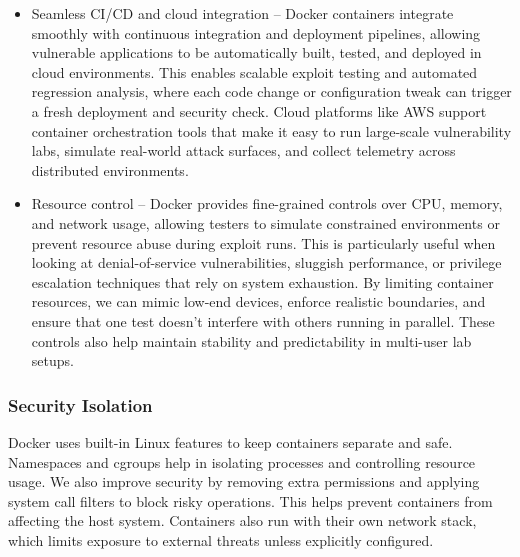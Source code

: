 \documentclass[12pt,titlepage]{article}
\begin{document}
\begin{itemize}
    \item {Seamless CI/CD and cloud integration} – Docker containers integrate smoothly with continuous integration and deployment pipelines, allowing vulnerable applications to be automatically built, tested, and deployed in cloud environments. This enables scalable exploit testing and automated regression analysis, where each code change or configuration tweak can trigger a fresh deployment and security check. Cloud platforms like AWS support container orchestration tools that make it easy to run large-scale vulnerability labs, simulate real-world attack surfaces, and collect telemetry across distributed environments.
	\item {Resource control} – Docker provides fine-grained controls over CPU, memory, and network usage, allowing testers to simulate constrained environments or prevent resource abuse during exploit runs. This is particularly useful when looking at denial-of-service vulnerabilities, sluggish performance, or privilege escalation techniques that rely on system exhaustion. By limiting container resources, we can mimic low-end devices, enforce realistic boundaries, and ensure that one test doesn’t interfere with others running in parallel. These controls also help maintain stability and predictability in multi-user lab setups.
  \end{itemize}

\subsubsection{Security Isolation}
Docker uses built-in Linux features to keep containers separate and safe. Namespaces and cgroups help in isolating processes and controlling resource usage. We also improve security by removing extra permissions and applying system call filters to block risky operations. This helps prevent containers from affecting the host system. Containers also run with their own network stack, which limits exposure to external threats unless explicitly configured.
\end{document}
